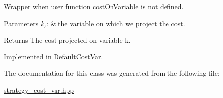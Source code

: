 \-Wrapper when user function cost\-On\-Variable is not defined. 


\begin{DoxyParams}{\-Parameters}
{\em k,\-:} & the variable on which we project the cost. \\
\hline
\end{DoxyParams}
\begin{DoxyReturn}{\-Returns}
\-The cost projected on variable k. 
\end{DoxyReturn}


\-Implemented in \hyperlink{classDefaultCostVar_a24820c1212f4e6f686156e9c0d3f2795}{\-Default\-Cost\-Var}.



\-The documentation for this class was generated from the following file\-:\begin{DoxyCompactItemize}
\item 
\hyperlink{strategy__cost__var_8hpp}{strategy\-\_\-cost\-\_\-var.\-hpp}\end{DoxyCompactItemize}
